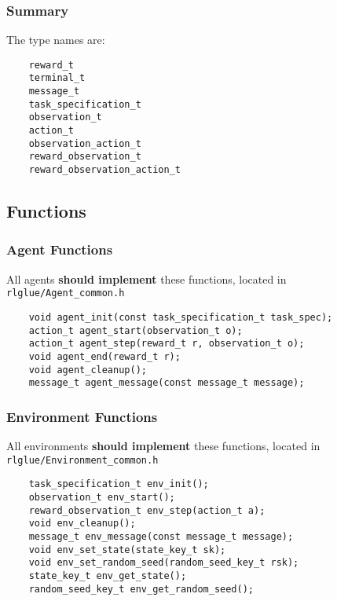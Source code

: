 \documentclass[11pt]{article}
\begin{document}
\subsubsection{Summary}
The type names are:
\begin{verbatim}
    reward_t
    terminal_t
    message_t
    task_specification_t
    observation_t
    action_t
    observation_action_t
    reward_observation_t
    reward_observation_action_t
\end{verbatim}


\subsection{Functions}
\subsubsection{Agent Functions}
All agents \textbf{should implement} these functions, located in \texttt{rlglue/Agent\_common.h}
\begin{verbatim}
    void agent_init(const task_specification_t task_spec);
    action_t agent_start(observation_t o);
    action_t agent_step(reward_t r, observation_t o);
    void agent_end(reward_t r);  
    void agent_cleanup();
    message_t agent_message(const message_t message);
\end{verbatim}

\subsubsection{Environment Functions}
All environments \textbf{should implement} these functions, located in \texttt{rlglue/Environment\_common.h}
\begin{verbatim}
    task_specification_t env_init();
    observation_t env_start();
    reward_observation_t env_step(action_t a);
    void env_cleanup();
    message_t env_message(const message_t message);
    void env_set_state(state_key_t sk);
    void env_set_random_seed(random_seed_key_t rsk);
    state_key_t env_get_state();
    random_seed_key_t env_get_random_seed();
\end{verbatim}
\end{document}
